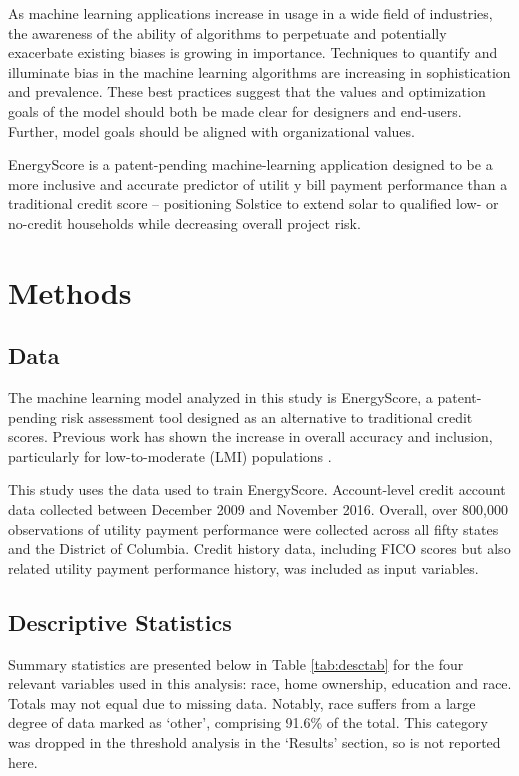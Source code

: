 \documentclass[11pt,]{article}
\begin{document}
As machine learning applications increase in usage in a wide field of
industries, the awareness of the ability of algorithms to perpetuate and
potentially exacerbate existing biases is growing in importance.
Techniques to quantify and illuminate bias in the machine learning
algorithms are increasing in sophistication and prevalence. These best
practices suggest that the values and optimization goals of the model
should both be made clear for designers and end-users. Further, model
goals should be aligned with organizational values.

EnergyScore is a patent-pending machine-learning application designed to
be a more inclusive and accurate predictor of utilit y bill payment
performance than a traditional credit score -- positioning Solstice to
extend solar to qualified low- or no-credit households while decreasing
overall project risk.

\hypertarget{methods}{%
\section{Methods}\label{methods}}

\hypertarget{data}{%
\subsection{Data}\label{data}}

The machine learning model analyzed in this study is EnergyScore, a
patent-pending risk assessment tool designed as an alternative to
traditional credit scores. Previous work has shown the increase in
overall accuracy and inclusion, particularly for low-to-moderate (LMI)
populations \citet{NBERw26178}.

This study uses the data used to train EnergyScore. Account-level credit
account data collected between December 2009 and November 2016. Overall,
over 800,000 observations of utility payment performance were collected
across all fifty states and the District of Columbia. Credit history
data, including FICO scores but also related utility payment performance
history, was included as input variables.

\hypertarget{descriptive-statistics}{%
\subsection{Descriptive Statistics}\label{descriptive-statistics}}

Summary statistics are presented below in Table \ref{tab:desctab} for
the four relevant variables used in this analysis: race, home ownership,
education and race. Totals may not equal due to missing data. Notably,
race suffers from a large degree of data marked as `other', comprising
91.6\% of the total. This category was dropped in the threshold analysis
in the `Results' section, so is not reported here.
\end{document}
